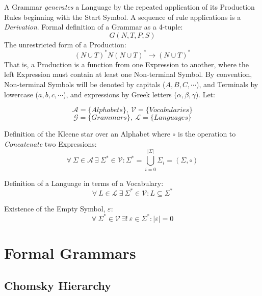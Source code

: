 \documentclass{article}
\begin{document}
A Grammar \emph{generates} a Language by the repeated application of
its Production Rules beginning with the Start Symbol. A sequence of
rule applications is a \emph{Derivation}. Formal definition of a
Grammar as a 4-tuple:
\[
    G(N,T,P,S)
\]
The unrestricted form of a Production:
\[
    (N \cup T)^*N(N \cup T)^* \rightarrow (N \cup T)^*
\]
That is, a Production is a function from one Expression to
another, where the left Expression must contain at least one
Non-terminal Symbol. By convention, Non-terminal Symbols
will be denoted by capitals ($A,B,C,\cdots$), and Terminals by
lowercase ($a,b,c,\cdots$), and expressions by Greek letters
($\alpha,\beta,\gamma$). Let:

\[
    \mathcal{A} = \{ Alphabets \},\: \mathcal{V} = \{ Vocabularies \}
\] \[
    \mathcal{G} = \{ Grammars \},\: \mathcal{L} = \{ Languages \}
\]

    \begin{description}

    \item Definition of the Kleene star over an
      Alphabet where $\circ$ is the operation to \emph{Concatenate} two
      Expressions:
    \[
        \forall \: \Sigma \in \mathcal{A} \:
        \exists \: \Sigma^* \in \mathcal{V}
        : \Sigma^* = \bigcup_{i=0}^{|\Sigma|} \Sigma_i
        = (\Sigma,\circ)
    \]

    \item Definition of a Language in terms of a Vocabulary:
    \[
        \forall \: L \in \mathcal{L} \:
        \exists \: \Sigma^* \in \mathcal{V}
        : L \subseteq \Sigma^*
    \]

    \item Existence of the Empty Symbol, $\varepsilon$:
    \[
        \forall \: \Sigma^* \in \mathcal{V} \:
        \exists ! \: \varepsilon \in \Sigma^*
        : |\varepsilon|=0
    \]

    \end{description}



\section{Formal Grammars}

\subsection{Chomsky Hierarchy}
\end{document}
